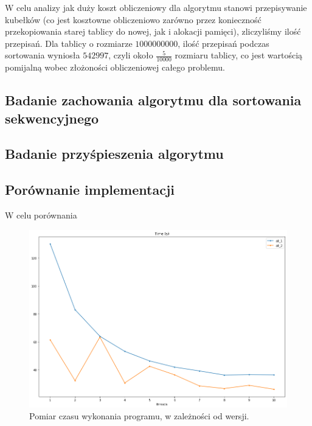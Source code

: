 \documentclass{article}
\begin{document}
    W celu analizy jak duży koszt obliczeniowy dla algorytmu stanowi przepisywanie kubełków (co jest kosztowne obliczeniowo zarówno przez konieczność przekopiowania starej tablicy do nowej, jak i alokacji pamięci), zliczyliśmy ilość przepisań. Dla tablicy o rozmiarze $1000 000 000$, ilość przepisań podczas sortowania wyniosła $542 997$, czyli około $\frac{5}{10000}$ rozmiaru tablicy, co jest wartością pomijalną wobec złożoności obliczeniowej całego problemu.
    
    \subsection{Badanie zachowania algorytmu dla sortowania sekwencyjnego}
    
    \subsection{Badanie przyśpieszenia algorytmu}
        
    \subsection{Porównanie implementacji}
    W celu porównania 
    
        \begin{figure}[h!]
            \centering
            \includegraphics[width=17cm]{report2/images/Compare/time.png}
            \caption{Pomiar czasu wykonania programu, w zależności od wersji. }
        \end{figure}
        
\end{document}
